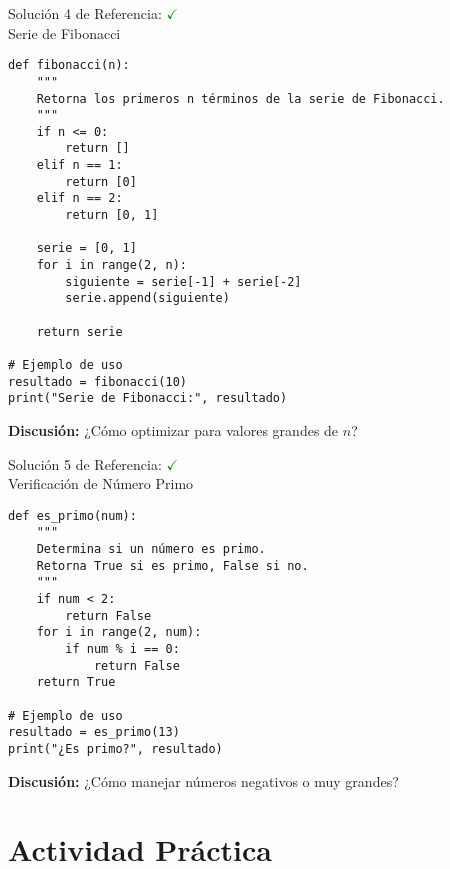 \documentclass[10pt]{beamer}
\begin{document}
\begin{frame}[fragile]{Solución 4 de Referencia: \hfill \textcolor{green}{$\checkmark$} \\ 
Serie de Fibonacci}
\begin{verbatim}
def fibonacci(n):
    """
    Retorna los primeros n términos de la serie de Fibonacci.
    """
    if n <= 0:
        return []
    elif n == 1:
        return [0]
    elif n == 2:
        return [0, 1]

    serie = [0, 1]
    for i in range(2, n):
        siguiente = serie[-1] + serie[-2]
        serie.append(siguiente)

    return serie

# Ejemplo de uso
resultado = fibonacci(10)
print("Serie de Fibonacci:", resultado)
\end{verbatim}
\textbf{Discusión:} ¿Cómo optimizar para valores grandes de \( n \)?
\end{frame}

\begin{frame}[fragile]{Solución 5 de Referencia: \hfill \textcolor{green}{$\checkmark$} \\ 
Verificación de Número Primo}
\begin{verbatim}
def es_primo(num):
    """
    Determina si un número es primo.
    Retorna True si es primo, False si no.
    """
    if num < 2:
        return False
    for i in range(2, num):
        if num % i == 0:
            return False
    return True

# Ejemplo de uso
resultado = es_primo(13)
print("¿Es primo?", resultado)
\end{verbatim}
\textbf{Discusión:} ¿Cómo manejar números negativos o muy grandes?
\end{frame}

\section{Actividad Práctica}
\end{document}
